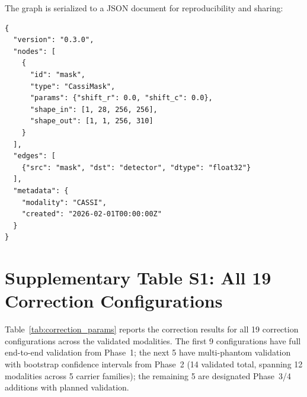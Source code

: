 \documentclass[11pt]{article}
\theoremstyle{definition}
\begin{document}
The graph is serialized to a JSON document for reproducibility and sharing:

\begin{verbatim}
{
  "version": "0.3.0",
  "nodes": [
    {
      "id": "mask",
      "type": "CassiMask",
      "params": {"shift_r": 0.0, "shift_c": 0.0},
      "shape_in": [1, 28, 256, 256],
      "shape_out": [1, 1, 256, 310]
    }
  ],
  "edges": [
    {"src": "mask", "dst": "detector", "dtype": "float32"}
  ],
  "metadata": {
    "modality": "CASSI",
    "created": "2026-02-01T00:00:00Z"
  }
}
\end{verbatim}

\newpage

\section{Supplementary Table S1: All 19 Correction Configurations}
\label{sec:params}

Table~\ref{tab:correction_params} reports the correction results for all 19
correction configurations across the validated modalities.  The first 9 configurations
have full end-to-end validation from Phase~1; the next 5 have multi-phantom
validation with bootstrap confidence intervals from Phase~2 (14 validated total,
spanning 12 modalities across 5 carrier families); the remaining 5 are
designated Phase~3/4 additions with planned validation.
\end{document}
